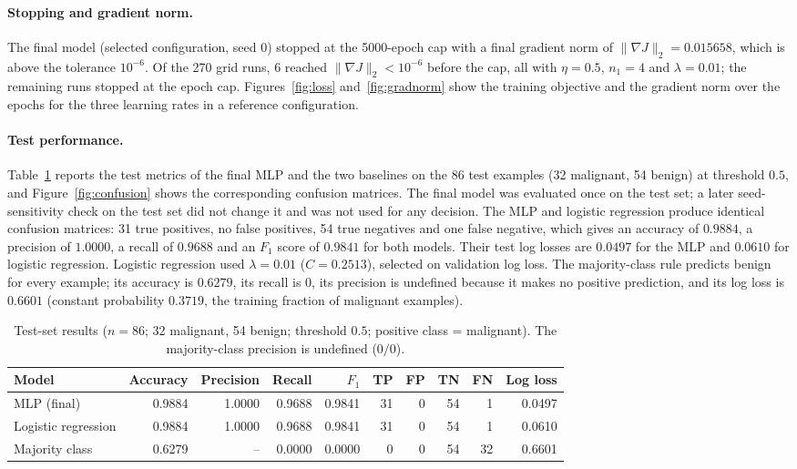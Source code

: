 \paragraph{Stopping and gradient norm.}
The final model (selected configuration, seed 0) stopped at the 5000-epoch cap with a final gradient norm of $\lVert\nabla J\rVert_2=0.015658$, which is above the tolerance $10^{-6}$. Of the 270 grid runs, 6 reached $\lVert\nabla J\rVert_2<10^{-6}$ before the cap, all with $\eta=0.5$, $n_1=4$ and $\lambda=0.01$; the remaining runs stopped at the epoch cap. Figures~\ref{fig:loss} and~\ref{fig:gradnorm} show the training objective and the gradient norm over the epochs for the three learning rates in a reference configuration.

\paragraph{Test performance.}
Table~\ref{tab:test} reports the test metrics of the final MLP and the two baselines on the 86 test examples (32 malignant, 54 benign) at threshold $0.5$, and Figure~\ref{fig:confusion} shows the corresponding confusion matrices. The final model was evaluated once on the test set; a later seed-sensitivity check on the test set did not change it and was not used for any decision. The MLP and logistic regression produce identical confusion matrices: 31 true positives, no false positives, 54 true negatives and one false negative, which gives an accuracy of $0.9884$, a precision of $1.0000$, a recall of $0.9688$ and an $F_1$ score of $0.9841$ for both models. Their test log losses are $0.0497$ for the MLP and $0.0610$ for logistic regression. Logistic regression used $\lambda=0.01$ ($C=0.2513$), selected on validation log loss. The majority-class rule predicts benign for every example; its accuracy is $0.6279$, its recall is $0$, its precision is undefined because it makes no positive prediction, and its log loss is $0.6601$ (constant probability $0.3719$, the training fraction of malignant examples).

\begin{table}[htbp]
  \centering
  \caption{Test-set results ($n=86$; 32 malignant, 54 benign; threshold $0.5$; positive class = malignant). The majority-class precision is undefined ($0/0$).}
  \label{tab:test}
  \small
  \setlength{\tabcolsep}{4pt}
  \begin{tabular}{@{}lrrrrrrrrr@{}}
    \toprule
    Model & Accuracy & Precision & Recall & $F_1$ & TP & FP & TN & FN & Log loss \\
    \midrule
    MLP (final)            & 0.9884 & 1.0000 & 0.9688 & 0.9841 & 31 & 0 & 54 & 1 & 0.0497 \\
    Logistic regression    & 0.9884 & 1.0000 & 0.9688 & 0.9841 & 31 & 0 & 54 & 1 & 0.0610 \\
    Majority class         & 0.6279 & -- & 0.0000 & 0.0000 & 0 & 0 & 54 & 32 & 0.6601 \\
    \bottomrule
  \end{tabular}
\end{table}

